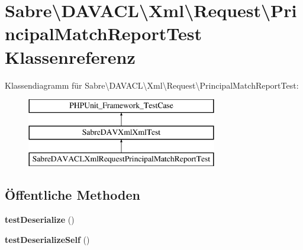 \hypertarget{class_sabre_1_1_d_a_v_a_c_l_1_1_xml_1_1_request_1_1_principal_match_report_test}{}\section{Sabre\textbackslash{}D\+A\+V\+A\+CL\textbackslash{}Xml\textbackslash{}Request\textbackslash{}Principal\+Match\+Report\+Test Klassenreferenz}
\label{class_sabre_1_1_d_a_v_a_c_l_1_1_xml_1_1_request_1_1_principal_match_report_test}
Klassendiagramm für Sabre\textbackslash{}D\+A\+V\+A\+CL\textbackslash{}Xml\textbackslash{}Request\textbackslash{}Principal\+Match\+Report\+Test\+:\begin{figure}[H]
\begin{center}
\leavevmode
\includegraphics[height=3.000000cm]{class_sabre_1_1_d_a_v_a_c_l_1_1_xml_1_1_request_1_1_principal_match_report_test}
\end{center}
\end{figure}
\subsection*{Öffentliche Methoden}
\begin{DoxyCompactItemize}
\item 
\mbox{\label{class_sabre_1_1_d_a_v_a_c_l_1_1_xml_1_1_request_1_1_principal_match_report_test_ae72edf63801ce73fb6b7b020ca7233ba}} 
{\bfseries test\+Deserialize} ()
\item 
\mbox{\label{class_sabre_1_1_d_a_v_a_c_l_1_1_xml_1_1_request_1_1_principal_match_report_test_a04ad076dc95ee251f332be9bd65796b9}} 
{\bfseries test\+Deserialize\+Self} ()
\end{DoxyCompactItemize}
